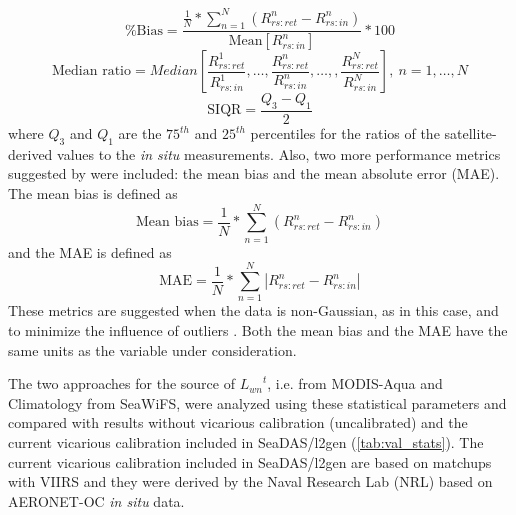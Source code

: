\documentclass[10pt]{article}
\begin{document}
\begin{equation}
    \text{\% Bias} = \frac{\displaystyle \frac{1}{N}*\sum_{n=1}^N(R_{rs:ret}^n-R_{rs:in}^n)}{\text{Mean}[R_{rs:in}^n]}*100
\end{equation}
\begin{equation}
  \text{Median ratio} =  Median\left[\frac{R_{rs:ret}^1}{R_{rs:in}^1},\dots,\frac{R_{rs:ret}^n}{R_{rs:in}^n},\dots,,\frac{R_{rs:ret}^N}{R_{rs:in}^N}\right],\ n=1,\dots,N
\end{equation}
\begin{equation}
    \text{SIQR} = \frac{Q_3-Q_1}{2}
\end{equation}
\noindent where $Q_3$ and $Q_1$ are the $75^{th}$ and $25^{th}$ percentiles for the ratios of the satellite-derived values to the {\it in situ} measurements.  
Also, two more performance metrics suggested by \cite{Seegers:18} were included: the mean bias and the mean absolute error (MAE). The mean bias is defined as
\begin{equation}
    \text{Mean bias} = \frac{1}{N}*\sum_{n=1}^N(R_{rs:ret}^n-R_{rs:in}^n)
\end{equation}
and the MAE is defined as
\begin{equation}
    \text{MAE} = \frac{1}{N}*\sum_{n=1}^N\left|R_{rs:ret}^n-R_{rs:in}^n\right|
\end{equation}
These metrics are suggested when the data is non-Gaussian, as in this case, and to minimize the influence of outliers \cite{Seegers:18}. Both the mean bias and the MAE have the same units as the variable under consideration.

The two approaches for the source of ${L_{wn}}^t$, i.e. from MODIS-Aqua and Climatology from SeaWiFS, were analyzed using these statistical parameters and compared with results without vicarious cal{}ibration (uncalibrated) and the current vicarious calibration included in SeaDAS/l2gen (\autoref{tab:val_stats}).
The current vicarious calibration included in SeaDAS/l2gen are based on matchups with VIIRS and they were derived by the Naval Research Lab (NRL) based on AERONET-OC {\it in situ} data.
\end{document}
